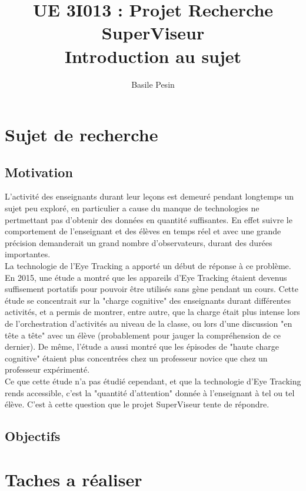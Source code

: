 \documentclass{article}
\title{UE 3I013 : Projet Recherche\\
    SuperViseur\\
    Introduction au sujet}
\author{Basile Pesin}
\begin{document}
\maketitle
\newpage

\section{Sujet de recherche}
\subsection{Motivation} 
L'activité des enseignants durant leur leçons est demeuré pendant longtemps un sujet peu exploré, en particulier a cause du manque de technologies ne pertmettant pas d'obtenir des données en quantité suffisantes. En effet suivre le comportement de l'enseignant et des élèves en temps réel et avec une grande précision demanderait un grand nombre d'observateurs, durant des durées importantes.\\
La technologie de l'Eye Tracking a apporté un début de réponse à ce problème. En 2015, une étude \cite{OrchestrationLoad} a montré que les appareils d'Eye Tracking étaient devenus suffisement portatifs pour pouvoir être utilisés sans gène pendant un cours. Cette étude se concentrait sur la "charge cognitive" des enseignants durant différentes activités, et a permis de montrer, entre autre, que la charge était plus intense lors de l'orchestration d'activités au niveau de la classe, ou lors d'une discussion "en tête a tête" avec un élève (probablement pour jauger la compréhension de ce dernier). De même, l'étude a aussi montré que les épisodes de "haute charge cognitive" étaient plus concentrées chez un professeur novice que chez un professeur expérimenté.\\
Ce que cette étude n'a pas étudié cependant, et que la technologie d'Eye Tracking rends accessible, c'est la "quantité d'attention" donnée à l'enseignant à tel ou tel élève. C'est à cette question que le projet SuperViseur \cite{SuperViseur} tente de répondre.

\subsection{Objectifs}

\section{Taches a réaliser}

{}

\end{document}
